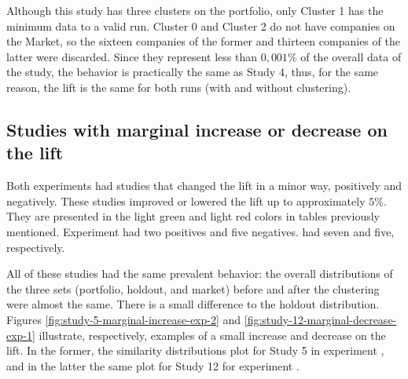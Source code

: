 Although this study has three clusters on the portfolio, only Cluster 1 has the minimum data to a valid run. Cluster 0 and Cluster 2 do not have companies on the Market, so the sixteen companies of the former and thirteen companies of the latter were discarded. Since they represent less than $0,001\%$ of the overall data of the study, the behavior is practically the same as Study 4, thus, for the same reason, the lift is the same for both runs (with and without clustering).

\subsection{Studies with marginal increase or decrease on the lift}
\label{ch:marginal-change}

Both experiments had studies that changed the lift in a minor way, positively and negatively. These studies improved or lowered the lift up to approximately $5\%$. They are presented in the light green and light red colors in tables previously mentioned. Experiment \nameExperimentI{} had two positives and five negatives. \nameExperimentII{} had seven and five, respectively.

All of these studies had the same prevalent behavior: the overall distributions of the three sets (portfolio, holdout, and market) before and after the clustering were almost the same. There is a small difference to the holdout distribution. Figures \ref{fig:study-5-marginal-increase-exp-2} and \ref{fig:study-12-marginal-decrease-exp-1} illustrate, respectively, examples of a small increase and decrease on the lift. In the former, the similarity distributions plot for Study 5 in experiment \nameExperimentII{}, and in the latter the same plot for Study 12 for experiment \nameExperimentI{}.


